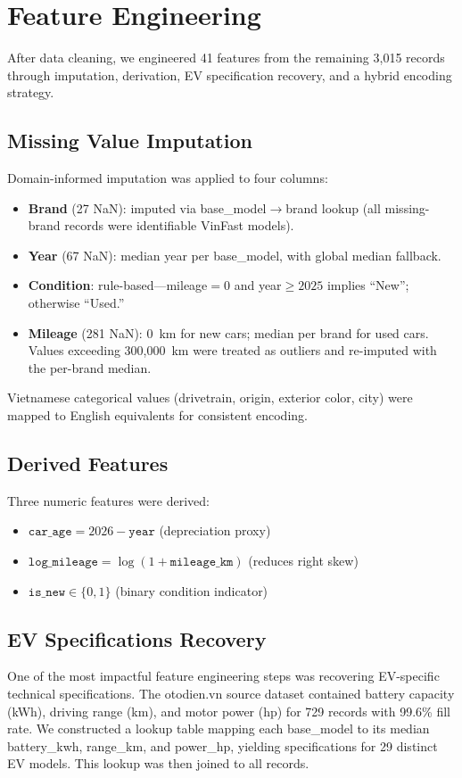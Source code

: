 \documentclass[lettersize,journal]{IEEEtran}
\begin{document}
\section{Feature Engineering}

After data cleaning, we engineered 41 features from the remaining 3,015
records through imputation, derivation, EV specification recovery, and a
hybrid encoding strategy.

\subsection{Missing Value Imputation}
Domain-informed imputation was applied to four columns:
\begin{itemize}
    \item \textbf{Brand} (27 NaN): imputed via base\_model$\to$brand lookup
    (all missing-brand records were identifiable VinFast models).
    \item \textbf{Year} (67 NaN): median year per base\_model, with global
    median fallback.
    \item \textbf{Condition}: rule-based---mileage$= 0$ and year$\geq 2025$
    implies ``New''; otherwise ``Used.''
    \item \textbf{Mileage} (281 NaN): 0~km for new cars; median per brand
    for used cars. Values exceeding 300,000~km were treated as outliers and
    re-imputed with the per-brand median.
\end{itemize}

Vietnamese categorical values (drivetrain, origin, exterior color, city) were
mapped to English equivalents for consistent encoding.

\subsection{Derived Features}
Three numeric features were derived:
\begin{itemize}
    \item $\texttt{car\_age} = 2026 - \texttt{year}$ (depreciation proxy)
    \item $\texttt{log\_mileage} = \log(1 + \texttt{mileage\_km})$ (reduces
    right skew)
    \item $\texttt{is\_new} \in \{0, 1\}$ (binary condition indicator)
\end{itemize}

\subsection{EV Specifications Recovery}
One of the most impactful feature engineering steps was recovering
EV-specific technical specifications. The otodien.vn source dataset contained
battery capacity (kWh), driving range (km), and motor power (hp) for 729
records with 99.6\% fill rate. We constructed a lookup table mapping each
base\_model to its median battery\_kwh, range\_km, and power\_hp, yielding
specifications for 29 distinct EV models. This lookup was then joined to all
records.
\end{document}
